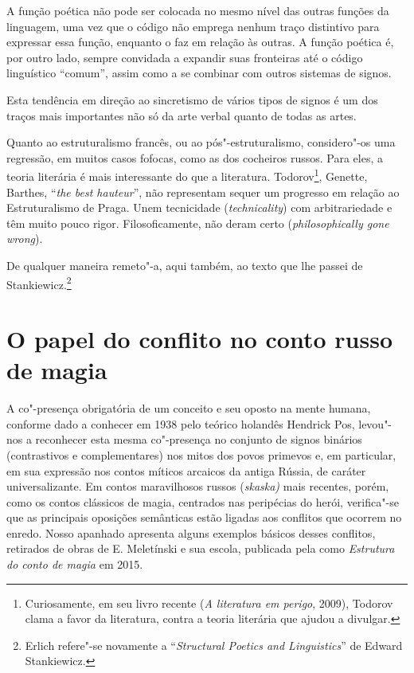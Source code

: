 A função poética não pode ser colocada no mesmo nível das outras funções
da linguagem, uma vez que o código não emprega nenhum traço distintivo
para expressar essa função, enquanto o faz em relação às outras. A
função poética é, por outro lado, sempre convidada a expandir suas
fronteiras até o código linguístico ``comum'', assim como a se combinar
com outros sistemas de signos.

Esta tendência em direção ao sincretismo de vários tipos de signos é um
dos traços mais importantes não só da arte verbal quanto de todas as
artes.

Quanto ao estruturalismo francês, ou ao pós"-estruturalismo, considero"-os
uma regressão, em muitos casos fofocas, como as dos cocheiros russos.
Para eles, a teoria literária é mais interessante do que a literatura.
Todorov\footnote{Curiosamente, em seu livro recente (\emph{A literatura
  em perigo}, 2009), Todorov clama a favor da literatura, contra a
  teoria literária que ajudou a divulgar.}, Genette, Barthes, ``\emph{the best hauteur}'', não representam
sequer um progresso em relação ao Estruturalismo de Praga. Unem
tecnicidade (\emph{technicality}) com arbitrariedade e têm muito pouco
rigor. Filosoficamente, não deram certo (\emph{philosophically gone
wrong}).

De qualquer maneira remeto"-a, aqui também, ao texto que lhe passei de
Stankiewicz.\footnote{Erlich refere"-se novamente a ``\emph{Structural
  Poetics and Linguistics}'' de Edward Stankiewicz.}

\chapter{O papel do conflito no conto russo de magia}


A co"-presença obrigatória de um conceito e seu oposto na mente humana,
conforme dado a conhecer em 1938 pelo teórico holandês Hendrick Pos,
levou"-nos a reconhecer esta mesma co"-presença no conjunto de signos
binários (contrastivos e complementares) nos mitos dos povos primevos e, em particular, em sua expressão nos contos míticos arcaicos da antiga
Rússia, de caráter universalizante. Em contos maravilhosos russos
(\emph{skaska)} mais recentes, porém, como os contos clássicos de
magia, centrados nas peripécias do herói, verifica"-se que as principais
oposições semânticas estão ligadas aos conflitos que ocorrem no enredo.
Nosso apanhado apresenta alguns exemplos básicos desses conflitos,
retirados de obras de E. Meletínski e sua escola, publicada pela 
como \emph{Estrutura do conto de magia} em 2015.

